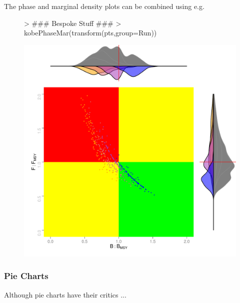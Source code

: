 \documentclass[shortnames,nojss,article]{jss}
\begin{document}
The phase and marginal density plots can be combined using  e.g.

\begin{figure}\begin{center}
\begin{Schunk}
\begin{Sinput}
> ### Bespoke Stuff ###
> kobePhaseMar(transform(pts,group=Run))          
\end{Sinput}
\end{Schunk}
\includegraphics{kobe-023}
\end{center}\end{figure}

\clearpage

\subsubsection{Pie Charts}

Although pie charts have their critics ...
\end{document}

